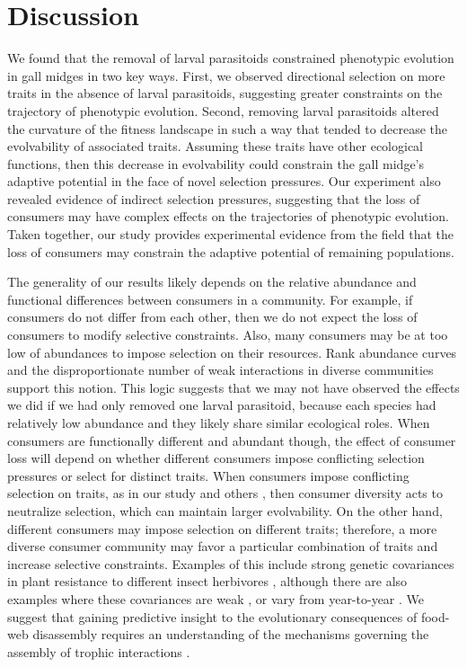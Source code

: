 \documentclass[11pt,]{article}
\begin{document}
\bigskip

\section{Discussion}\label{discussion}

We found that the removal of larval parasitoids constrained phenotypic
evolution in gall midges in two key ways. First, we observed directional
selection on more traits in the absence of larval parasitoids,
suggesting greater constraints on the trajectory of phenotypic
evolution. Second, removing larval parasitoids altered the curvature of
the fitness landscape in such a way that tended to decrease the
evolvability of associated traits. Assuming these traits have other
ecological functions, then this decrease in evolvability could constrain
the gall midge's adaptive potential in the face of novel selection
pressures. Our experiment also revealed evidence of indirect selection
pressures, suggesting that the loss of consumers may have complex
effects on the trajectories of phenotypic evolution. Taken together, our
study provides experimental evidence from the field that the loss of
consumers may constrain the adaptive potential of remaining populations.

The generality of our results likely depends on the relative abundance
and functional differences between consumers in a community. For
example, if consumers do not differ from each other, then we do not
expect the loss of consumers to modify selective constraints. Also, many
consumers may be at too low of abundances to impose selection on their
resources. Rank abundance curves \citep{Preston1948} and the
disproportionate number of weak interactions in diverse communities
\citep{Paine1992} support this notion. This logic suggests that we may
not have observed the effects we did if we had only removed one larval
parasitoid, because each species had relatively low abundance
\citep{Barbour2016} and they likely share similar ecological roles. When
consumers are functionally different and abundant though, the effect of
consumer loss will depend on whether different consumers impose
conflicting selection pressures or select for distinct traits. When
consumers impose conflicting selection on traits, as in our study and
others \citep{Weis1985, Abrahamson1997, Start2016, Start2018}, then
consumer diversity acts to neutralize selection, which can maintain
larger evolvability. On the other hand, different consumers may impose
selection on different traits; therefore, a more diverse consumer
community may favor a particular combination of traits and increase
selective constraints. Examples of this include strong genetic
covariances in plant resistance to different insect herbivores
\citep{Maddox1990, Wise2007, Wise2013}, although there are also examples
where these covariances are weak \citep{Roche1997, Barbour2015}, or vary
from year-to-year \citep{Johnson2007}. We suggest that gaining
predictive insight to the evolutionary consequences of food-web
disassembly requires an understanding of the mechanisms governing the
assembly of trophic interactions \citep{Bascompte2009}.
\end{document}
